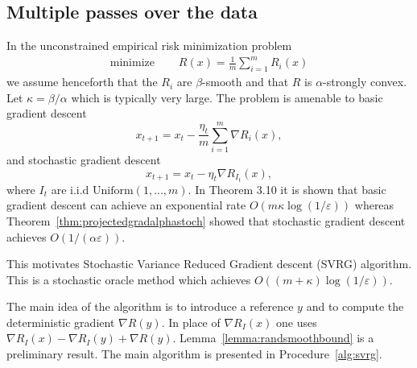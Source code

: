 \subsection{Multiple passes over the data}
In the unconstrained empirical risk minimization problem
\begin{align*}
	\text{minimize }\quad   & R(x) = \frac{1}{m}\sum_{i=1}^m R_i(x)
\end{align*}
we assume henceforth that the $R_i$ are $\beta$-smooth and that $R$ is $\alpha$-strongly convex. Let $\kappa = \beta/\alpha$ which is typically very large. The problem is amenable to basic gradient descent
\begin{equation*}
	x_{t+1}= x_t - \frac{\eta_t}{m}\sum_{i=1}^m \nabla R_i(x),
\end{equation*}
and stochastic gradient descent
\begin{equation*}
	x_{t+1}= x_t - \eta_t \nabla R_{I_t}(x),
\end{equation*}
where $I_t$ are i.i.d $\text{Uniform}(1, ..., m)$. In \cite{bubeck} Theorem 3.10 it is shown that basic gradient descent can achieve an exponential rate $O(m\kappa\log(1/\varepsilon))$ whereas Theorem~\ref{thm:projectedgradalphastoch} showed that stochastic gradient descent achieves $O(1/(\alpha\varepsilon))$.

This motivates Stochastic Variance Reduced Gradient descent (SVRG) algorithm. This is a stochastic oracle method which achieves $O((m+\kappa)\log(1/\varepsilon))$.

The main idea of the algorithm is to introduce a reference $y$ and to compute the deterministic gradient $\nabla R(y)$. In place of $\nabla R_I(x)$ one uses $\nabla R_I(x) - \nabla R_I(y) + \nabla R(y)$. Lemma~\ref{lemma:randsmoothbound} is a preliminary result. The main algorithm is presented in Procedure~\ref{alg:svrg}.

